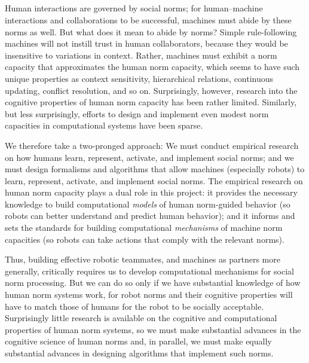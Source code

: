
\subsection{}

Human interactions are governed by social norms; for human--machine
interactions and collaborations to be successful, machines must abide
by these norms as well. But what does it mean to abide by norms?
Simple rule-following machines will not instill trust in human
collaborators, because they would be insensitive to variations in
context.  Rather, machines must exhibit a norm capacity that
approximates the human norm capacity, which seems to have such unique
properties as context sensitivity, hierarchical relations, continuous
updating, conflict resolution, and so on.  Surprisingly, however,
research into the cognitive properties of human norm capacity has been
rather limited. Similarly, but less surprisingly, efforts to design
and implement even modest norm capacities in computational systems
have been sparse.

We therefore take a two-pronged approach: We must conduct empirical
research on how humans learn, represent, activate, and implement
social norms; and we must design formalisms and algorithms that allow
machines (especially robots) to learn, represent, activate, and
implement social norms.  The empirical research on human norm capacity
plays a dual role in this project: it provides the necessary knowledge
to build computational {\em models} of human norm-guided behavior (so
robots can better understand and predict human behavior); and it
informs and sets the standards for building computational {\em
  mechanisms} of machine norm capacities (so robots can take actions
that comply with the relevant norms).


Thus, building effective robotic teammates, and machines as partners
more generally, critically requires us to develop computational
mechanisms for social norm processing.  But we can do so only if we
have substantial knowledge of how human norm systems work, for robot
norms and their cognitive properties will have to match those of
humans for the robot to be socially acceptable.  Surprisingly little
research is available on the cognitive and computational properties of
human norm systems, so we must make substantial advances in the
cognitive science of human norms and, in parallel, we must make
equally substantial advances in designing algorithms that implement
such norms.

